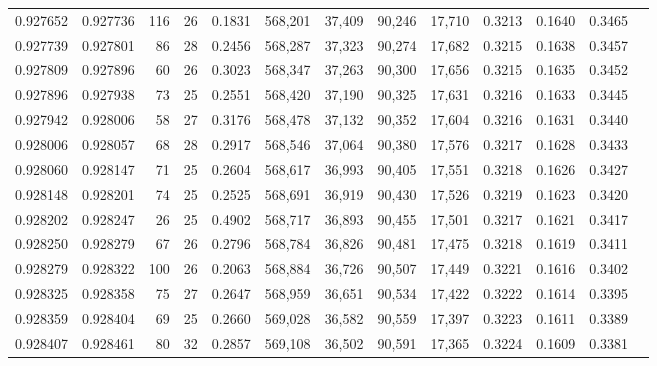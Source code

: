 \begin{tabular}{rrrrrrrrrrrrr}
0.927652 & 0.927736 &   116 &  26 &                                     0.1831 & 568,201 &  37,409 &  90,246 &  17,710 & 0.3213 & 0.1640 & 0.3465 \\
0.927739 & 0.927801 &    86 &  28 &                                     0.2456 & 568,287 &  37,323 &  90,274 &  17,682 & 0.3215 & 0.1638 & 0.3457 \\
0.927809 & 0.927896 &    60 &  26 &                                     0.3023 & 568,347 &  37,263 &  90,300 &  17,656 & 0.3215 & 0.1635 & 0.3452 \\
0.927896 & 0.927938 &    73 &  25 &                                     0.2551 & 568,420 &  37,190 &  90,325 &  17,631 & 0.3216 & 0.1633 & 0.3445 \\
0.927942 & 0.928006 &    58 &  27 &                                     0.3176 & 568,478 &  37,132 &  90,352 &  17,604 & 0.3216 & 0.1631 & 0.3440 \\
0.928006 & 0.928057 &    68 &  28 &                                     0.2917 & 568,546 &  37,064 &  90,380 &  17,576 & 0.3217 & 0.1628 & 0.3433 \\
0.928060 & 0.928147 &    71 &  25 &                                     0.2604 & 568,617 &  36,993 &  90,405 &  17,551 & 0.3218 & 0.1626 & 0.3427 \\
0.928148 & 0.928201 &    74 &  25 &                                     0.2525 & 568,691 &  36,919 &  90,430 &  17,526 & 0.3219 & 0.1623 & 0.3420 \\
0.928202 & 0.928247 &    26 &  25 &                                     0.4902 & 568,717 &  36,893 &  90,455 &  17,501 & 0.3217 & 0.1621 & 0.3417 \\
0.928250 & 0.928279 &    67 &  26 &                                     0.2796 & 568,784 &  36,826 &  90,481 &  17,475 & 0.3218 & 0.1619 & 0.3411 \\
0.928279 & 0.928322 &   100 &  26 &                                     0.2063 & 568,884 &  36,726 &  90,507 &  17,449 & 0.3221 & 0.1616 & 0.3402 \\
0.928325 & 0.928358 &    75 &  27 &                                     0.2647 & 568,959 &  36,651 &  90,534 &  17,422 & 0.3222 & 0.1614 & 0.3395 \\
0.928359 & 0.928404 &    69 &  25 &                                     0.2660 & 569,028 &  36,582 &  90,559 &  17,397 & 0.3223 & 0.1611 & 0.3389 \\
0.928407 & 0.928461 &    80 &  32 &                                     0.2857 & 569,108 &  36,502 &  90,591 &  17,365 & 0.3224 & 0.1609 & 0.3381 \\

\end{tabular}

